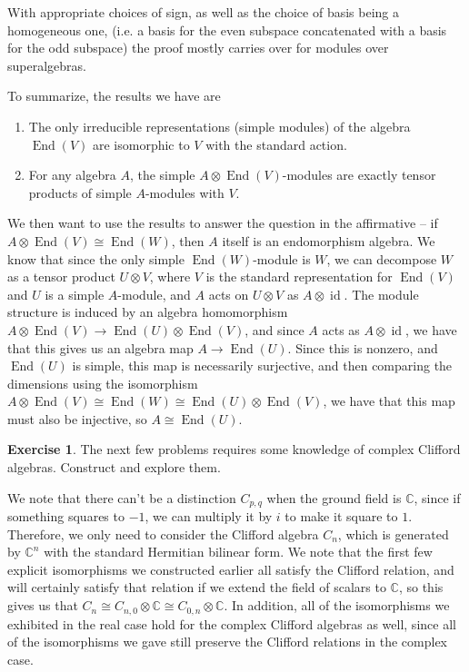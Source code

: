 \documentclass[psamsfonts]{amsart}
\theoremstyle{definition}
\newtheorem{exer}[thm]{Exercise}
\theoremstyle{remark}
\newcommand{\C}{\mathbb{C}}
\DeclareMathOperator{\id}{id}
\DeclareMathOperator{\End}{End}
\begin{document}
With appropriate choices of sign, as well as the choice of basis being a homogeneous one, (i.e. a basis for the even subspace concatenated with a basis for the odd subspace) the proof mostly carries over for modules over superalgebras.

To summarize, the results we have are
\begin{enumerate}
\item The only irreducible representations (simple modules) of the algebra $\End(V)$ are isomorphic to $V$ with the standard action.
\item For any algebra $A$, the simple $A \otimes \End(V)$-modules are exactly tensor products of simple $A$-modules with $V$.
\end{enumerate}
We then want to use the results to answer the question in the affirmative -- if $A \otimes \End(V) \cong \End(W)$, then $A$ itself is an endomorphism algebra. We know that since the only simple $\End(W)$-module is $W$, we can decompose $W$ as a tensor product $U \otimes V$, where $V$ is the standard representation for $\End(V)$ and $U$ is a simple $A$-module, and $A$ acts on $U \otimes V$ as $A \otimes \id$. The module structure is induced by an algebra homomorphism $A \otimes \End(V) \to \End(U) \otimes \End(V)$, and since $A$ acts as $A \otimes \id$, we have that this gives us an algebra map $A \to \End(U)$. Since this is nonzero, and $\End(U)$ is simple, this map is necessarily surjective, and then comparing the dimensions using the isomorphism $A \otimes \End(V) \cong \End(W) \cong \End(U) \otimes \End(V)$, we have that this map must also be injective, so $A \cong \End(U)$.
%
\begin{exer}
The next few problems requires some knowledge of complex Clifford algebras. Construct and explore them.
\end{exer}
%
We note that there can't be a distinction $C_{p,q}$ when the ground field is $\C$, since if something squares to $-1$, we can multiply it by $i$ to make it square to $1$. Therefore, we only need to consider the Clifford algebra $C_n$, which is generated by $\C^n$ with the standard Hermitian bilinear form. We note that the first few explicit isomorphisms we constructed earlier all satisfy the Clifford relation, and will certainly satisfy that relation if we extend the field of scalars to $\C$, so this gives us that $C_n \cong C_{n,0} \otimes \C \cong C_{0,n} \otimes \C$. In addition, all of the isomorphisms we exhibited in the real case hold for the complex Clifford algebras as well, since all of the isomorphisms we gave still preserve the Clifford relations in the complex case. 
\end{document}
